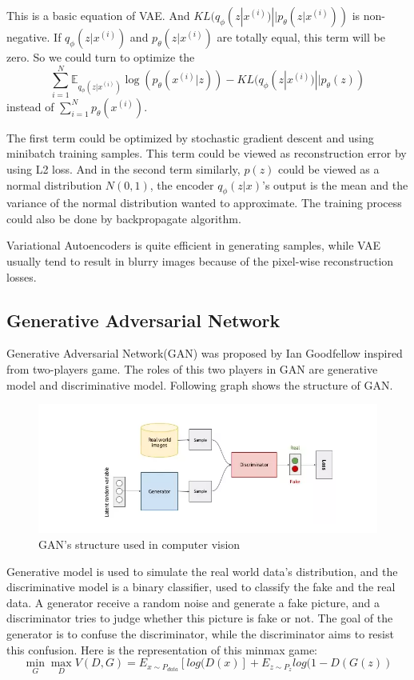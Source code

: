 \documentclass{kththesis}
\begin{document}
This is a basic equation of VAE. And $KL(q_{\phi}(z|x^{(i)})||p_{\theta}(z|x^{(i)}))$ is non-negative. If $q_{\phi}(z|x^{(i)})$ and $p_{\theta}(z|x^{(i)})$ are totally equal, this term will be zero. So we could turn to optimize the
\begin{equation}
     \sum_{i=1}^N\mathbb{E}_{q_{\phi}(z|x^{(i)})} \log(p_{\theta}(x^{(i)}|z)) - KL(q_{\phi}(z|x^{(i)})||p_{\theta}(z))
\end{equation}
instead of $\sum_{i=1}^N p_\theta(x^{(i)})$.

The first term could be optimized by stochastic gradient descent and using minibatch training samples. This term could be viewed as reconstruction error by using L2 loss. And in the second term similarly, $p(z)$ could be viewed as a normal distribution $N(0,1)$,  the encoder $q_{\phi}(z|x)$'s output is the mean and the variance of the normal distribution wanted to approximate. The training process could also be done by backpropagate algorithm. 

\noindent Variational Autoencoders is quite efficient in generating samples, while VAE usually tend to result in blurry images\cite{doersch2016tutorial} because of the pixel-wise reconstruction losses.
\subsection{Generative Adversarial Network}
Generative Adversarial Network(GAN) was proposed by Ian Goodfellow\cite{goodfellow2014generative} inspired from two-players game. The roles of this two players in GAN are generative model and discriminative model. Following graph shows the structure of GAN.

\begin{figure}[H]
    \centering
    \includegraphics[scale = 0.6]{GAN.png}
    \caption{GAN's structure used in computer vision}
\end{figure}

\noindent Generative model is used to simulate the real world data's distribution, and the discriminative model is a binary classifier, used to classify the fake and the real data. A generator receive a random noise and generate a fake picture, and a discriminator tries to judge whether this picture is fake or not. The goal of the generator is to confuse the discriminator, while the discriminator aims to resist this confusion. Here is the representation of this minmax game:
\begin{equation}
    \min \limits_G \max \limits_D V(D,G) = E_{x\sim P_{data}}[log(D(x)] +  E_{z\sim P_{z}}log(1-D(G(z)) 
\end{equation}
\end{document}
